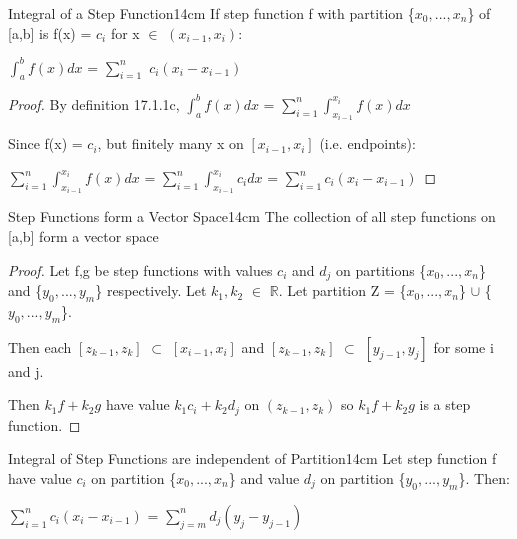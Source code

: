     \vspace{0.5cm}



    \begin{wtheorem}{Integral of a Step Function}{14cm}
        If step function f with partition \{$x_0,...,x_n$\} of [a,b]
        is f(x) = $c_i$ for x $\in$ $(x_{i-1},x_i)$:

        \hspace{0.5cm}
        $\int_a^b f(x) dx$
        = $\sum_{i=1}^n$ $c_i(x_i - x_{i-1})$
    \end{wtheorem}

    \begin{proof}
        By {\color{blue} definition 17.1.1c},
        $\int_a^b f(x) dx$
        = $\sum_{i=1}^n \int_{x_{i-1}}^{x_i} f(x) dx$

        Since f(x) = $c_i$, but finitely many x on $[x_{i-1},x_i]$ (i.e. endpoints):

        \hspace{0.5cm}
        $\sum_{i=1}^n \int_{x_{i-1}}^{x_i} f(x) dx$
        = $\sum_{i=1}^n \int_{x_{i-1}}^{x_i} c_i dx$
        = $\sum_{i=1}^n c_i(x_i - x_{i-1})$
    \end{proof}

    \newpage



    \begin{wtheorem}{Step Functions form a Vector Space}{14cm}
        The collection of all step functions on [a,b] form a vector space
    \end{wtheorem}

    \begin{proof}
        Let f,g be step functions with values $c_i$ and $d_j$ on partitions
        \{$x_0,...,x_n$\} and \{$y_0,...,y_m$\} respectively.
        Let $k_1,k_2$ $\in$ $\mathbb{R}$.
        Let partition Z = \{$x_0,...,x_n$\} $\cup$ \{$y_0,...,y_m$\}.

        Then each $[z_{k-1},z_k]$ $\subset$ $[x_{i-1},x_i]$
        and $[z_{k-1},z_k]$ $\subset$ $[y_{j-1},y_j]$ for some i and j.

        Then $k_1f + k_2g$
        have value $k_1c_i + k_2d_j$ on $(z_{k-1},z_k)$
        so $k_1f + k_2g$ is a step function.
    \end{proof}

    \vspace{0.5cm}



    \begin{wtheorem}{Integral of Step Functions are independent of Partition}{14cm}
        Let step function f have value $c_i$ on partition \{$x_0,...,x_n$\}
        and value $d_j$ on partition \{$y_0,...,y_m$\}. Then:

        \hspace{0.5cm}
        $\sum_{i=1}^n c_i(x_i - x_{i-1})$
        = $\sum_{j=m}^n d_j(y_j - y_{j-1})$
    \end{wtheorem}

